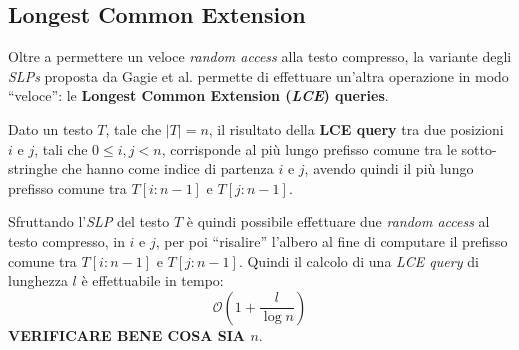 \subsection{Longest Common Extension}
Oltre a permettere un veloce \textit{random access} alla testo compresso, la
variante degli \textit{SLPs} proposta da Gagie et al. permette di effettuare
un'altra operazione in modo ``veloce'': le \textbf{Longest Common Extension
  (\textit{LCE}) queries}.
\begin{definizione}
  Dato un testo $T$, tale che $|T|=n$, il risultato della \textbf{LCE query} tra
  due posizioni $i$ e $j$, tali che $0\leq i,j<n$, corrisponde al più lungo
  prefisso comune tra le sotto-stringhe che hanno come indice di partenza $i$ e
  $j$, avendo quindi il più lungo prefisso comune tra $T[i:n-1]$ e $T[j:n-1]$.
\end{definizione}
Sfruttando l'\textit{SLP} del testo $T$ è quindi possibile effettuare due
\textit{random access} al testo compresso, in $i$ e $j$, per poi ``risalire''
l'albero al fine di computare il prefisso comune tra $T[i:n-1]$ e
$T[j:n-1]$. Quindi il calcolo di una \textit{LCE query} di lunghezza $l$ è
effettuabile in tempo:
\[\mathcal{O}\left(1+\frac{l}{\log n}\right)\]
\textbf{VERIFICARE BENE COSA SIA $n$}.